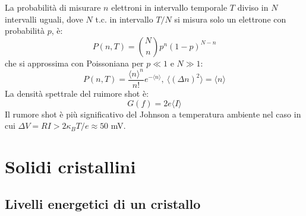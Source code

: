 \documentclass[10pt, a4paper]{scrartcl}
\numberwithin{equation}{subsection}
\theoremstyle{style1}
\theoremstyle{style2}
\begin{document}
La probabilit\`a di misurare $n$ elettroni in intervallo temporale $T$ diviso in $N$ intervalli uguali, dove $N$ t.c. in intervallo $T / N$ si misura solo un elettrone con probabilit\`a $p$, \`e:
\begin{equation}
	P(n,T) = \binom{N}{n} p^n (1-p)^{N-n} 
\end{equation}
che si approssima con Poissoniana per $p\ll 1 $ e $N \gg 1$:
\begin{equation}
	P(n,T) = \frac{\langle n \rangle^n}{n!}e^{- \langle n \rangle} ,\ \langle (\Delta n)^2 \rangle = \langle n \rangle
\end{equation}
La densit\`a spettrale del ruimore shot \`e:
\begin{equation}
	G(f) = 2e \langle I \rangle
\end{equation}
Il rumore shot \`e pi\`u significativo del Johnson a temperatura ambiente nel caso in cui $\Delta V = RI > 2\kappa _BT / e \approx 50$ mV.







































\newpage
\section{Solidi cristallini}
\subsection{Livelli energetici di un cristallo}
\end{document}

